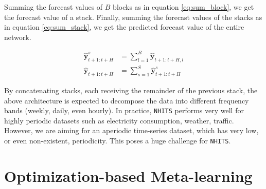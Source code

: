 Summing the forecast values of $B$ blocks as in equation \ref{eq:sum_block}, we get the forecast value of a stack. Finally, summing the forecast values of the stacks as in equation \ref{eq:sum_stack}, we get the predicted forecast value of the entire network.

\begin{align}
    \mathbf{\hat{y}}_{t+1:t+H}^s &= \sum_{l=1}^{B}{\mathbf{\hat{y}}_{t+1:t+H, l}} \label{eq:sum_block}\\
    \mathbf{\hat{y}}_{t+1:t+H} &= \sum_{s=1}^{S}{\mathbf{\hat{y}}_{t+1:t+H}^s} \label{eq:sum_stack}
\end{align}


By concatenating stacks, each receiving the remainder of the previous stack, the above architecture is expected to decompose the data into different frequency bands (weekly, daily, even hourly). In practice, \verb|NHITS| performs very well for highly periodic datasets such as electricity consumption, weather, traffic. However, we are aiming for an aperiodic time-series dataset, which has very low, or even non-existent, periodicity. This poses a huge challenge for \verb|NHITS|.

\section{Optimization-based Meta-learning}
\label{sec:ml}



